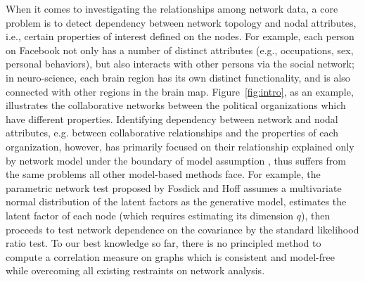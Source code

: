 \documentclass[11pt]{article}
\theoremstyle{definition}
\begin{document}
When it comes to investigating the relationships among network data, a core problem is to detect dependency between network topology and nodal attributes, i.e., certain properties of interest defined on the nodes. For example, each person on Facebook not only has a number of distinct attributes (e.g., occupations, sex, personal behaviors), but also interacts with other persons via the social network; in neuro-science, each brain region has its own distinct functionality, and is also connected with other regions in the brain map. Figure~\ref{fig:intro}, as an example, illustrates the collaborative networks between the political organizations which have different properties. Identifying dependency between network and nodal attributes, e.g. between collaborative relationships and the properties of each organization, however, has primarily focused on their relationship explained only by network model under the boundary of model assumption \cite{wasserman1996logit, fosdick2015testing, howard2016understanding}, thus suffers from the same problems all other model-based methods face. For example, the parametric network test proposed by Fosdick and Hoff \cite{fosdick2015testing} assumes a multivariate normal distribution of the latent factors as the generative model, estimates the latent factor of each node (which requires estimating its dimension $q$), then proceeds to test network dependence on the covariance by the standard likelihood ratio test. To our best knowledge so far, there is no principled method to compute a correlation measure on graphs which is consistent and model-free while overcoming all existing restraints on network analysis. 
\end{document}
